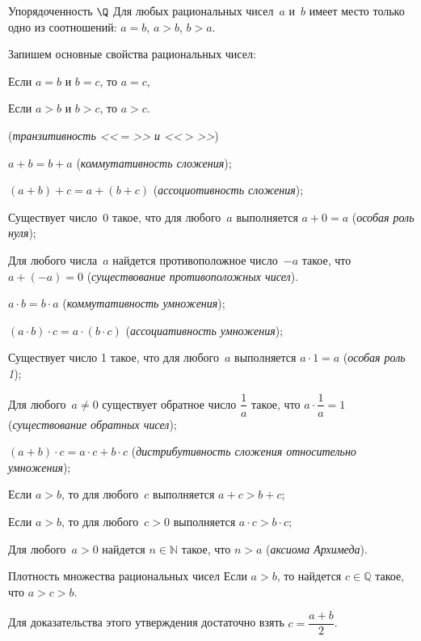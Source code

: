 \begin{mtopic}{Упорядоченность \(\Q\)}
Для любых рациональных чисел~\(a\) и~\(b\) имеет место только одно из соотношений: \(a = b\), \(a >
b\), \(b > a\).
\end{mtopic}

Запишем основные свойства рациональных чисел:

\begin{properties}
\item Если \(a = b\) и \(b = c\), то \(a = c\),

Если \(a > b\) и \(b > c\), то \(a > c\).

(\textit{транзитивность <<\(=\)>> и <<\(>\)>>})

\item \(a + b = b + a\) (\textit{коммутативность сложения});
\item \((a + b) + c = a + (b + c)\) (\textit{ассоциотивность сложения});
\item Существует число~\(0\) такое, что для любого~\(a\) выполняется \(a + 0 = a\) (\textit{особая
    роль нуля});
\item Для любого числа~\(a\) найдется противоположное число~\(-a\) такое, что \(a + (-a) = 0\)
    (\textit{существование противоположных чисел}).
\item \(a \cdot b = b \cdot a\) (\textit{коммутативность умножения});
\item \((a \cdot b) \cdot c = a \cdot (b \cdot c)\) (\textit{ассоциативность умножения});
\item Существует число 1 такое, что для любого~\(a\) выполняется \(a \cdot 1 = a\) (\textit{особая
    роль 1});
\item Для любого~\(a \neq 0\) существует обратное число \(\dfrac{1}{a}\) такое, что \(a \cdot
    \dfrac{1}{a} = 1\) (\textit{существование обратных чисел});
\item \((a + b) \cdot c = a \cdot c + b \cdot c\) (\textit{дистрибутивность сложения относительно
    умножения});
\item Если \(a > b\), то для любого~\(c\) выполняется \(a + c > b + c\);
\item Если \(a > b\), то для любого~\(c > 0\) выполняется \(a \cdot c > b \cdot c\);
\item Для любого~\(a > 0\) найдется \(n \in \mathbb{N}\) такое, что \(n > a\) (\textit{аксиома
    Архимеда}).
\end{properties}

\begin{mtopic}{Плотность множества рациональных чисел}
Если \(a > b\), то найдется \(c \in \mathbb{Q}\) такое, что \(a > c > b\).

Для доказательства этого утверждения достаточно взять \(c = \dfrac{a + b}{2}\).
\end{mtopic}

